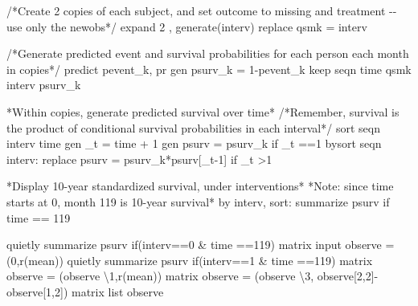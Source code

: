 \documentclass[
  10pt,
  a4paper,
]{book}
\newenvironment{Shaded}{\begin{snugshade}}{\end{snugshade}}
\newcommand{\BaseNTok}[1]{\textcolor[rgb]{0.68,0.00,0.00}{#1}}
\newcommand{\CommentTok}[1]{\textcolor[rgb]{0.37,0.37,0.37}{#1}}
\newcommand{\FunctionTok}[1]{\textcolor[rgb]{0.28,0.35,0.67}{#1}}
\newcommand{\KeywordTok}[1]{\textcolor[rgb]{0.00,0.46,0.62}{#1}}
\newcommand{\NormalTok}[1]{\textcolor[rgb]{0.00,0.46,0.62}{#1}}
\newcommand{\OtherTok}[1]{\textcolor[rgb]{0.00,0.46,0.62}{#1}}
\begin{document}
\begin{Shaded}
\begin{Highlighting}[]
\CommentTok{/*Create 2 copies of each subject, and set outcome }
\CommentTok{to missing and treatment {-}{-} use only the newobs*/}
\NormalTok{expand 2 , }\KeywordTok{generate}\NormalTok{(interv) }
\KeywordTok{replace}\NormalTok{ qsmk = interv   }

\CommentTok{/*Generate predicted event and survival probabilities }
\CommentTok{for each person each month in copies*/}
\KeywordTok{predict}\NormalTok{ pevent\_k, pr}
\KeywordTok{gen}\NormalTok{ psurv\_k = 1{-}pevent\_k}
\KeywordTok{keep}\NormalTok{ seqn time qsmk interv psurv\_k }

\NormalTok{*Within copies, }\KeywordTok{generate}\NormalTok{ predicted survival }\BaseNTok{over}\NormalTok{ time*}
\CommentTok{/*Remember, survival is the product of conditional survival}
\CommentTok{probabilities in each interval*/}
\KeywordTok{sort}\NormalTok{ seqn interv time}
\KeywordTok{gen}\NormalTok{ \_t = time + 1}
\KeywordTok{gen}\NormalTok{ psurv = psurv\_k }\KeywordTok{if}\NormalTok{ \_t ==1       }
\KeywordTok{bysort}\NormalTok{ seqn interv: }\KeywordTok{replace}\NormalTok{ psurv = psurv\_k*psurv[\_t{-}1] }\KeywordTok{if}\NormalTok{ \_t \textgreater{}1 }

\NormalTok{*Display 10{-}}\FunctionTok{year}\NormalTok{ standardized survival, under interventions*}
\NormalTok{*Note: since time starts }\FunctionTok{at}\NormalTok{ 0, }\FunctionTok{month}\NormalTok{ 119 is 10{-}}\FunctionTok{year}\NormalTok{ survival*}
\KeywordTok{by}\NormalTok{ interv, }\KeywordTok{sort}\NormalTok{: }\KeywordTok{summarize}\NormalTok{ psurv }\KeywordTok{if}\NormalTok{ time == 119}

\KeywordTok{quietly} \KeywordTok{summarize}\NormalTok{ psurv }\KeywordTok{if}\NormalTok{(interv==0 \& time ==119)}
\FunctionTok{matrix}\NormalTok{ input observe = (0,}\OtherTok{\textasciigrave{}r(mean)\textquotesingle{}}\NormalTok{)}
\KeywordTok{quietly} \KeywordTok{summarize}\NormalTok{ psurv }\KeywordTok{if}\NormalTok{(interv==1 \& time ==119)}
\FunctionTok{matrix}\NormalTok{ observe = (observe \textbackslash{}1,}\OtherTok{\textasciigrave{}r(mean)\textquotesingle{}}\NormalTok{)}
\FunctionTok{matrix}\NormalTok{ observe = (observe \textbackslash{}3, observe[2,2]{-}observe[1,2]) }
\FunctionTok{matrix} \OtherTok{list}\NormalTok{ observe}


\end{Highlighting}
\end{Shaded}
\end{document}
